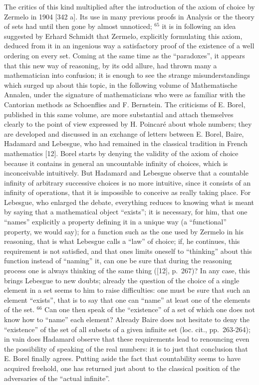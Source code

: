 The critics of this kind multiplied after the introduction of the axiom of choice by Zermelo in 1904 {[}342 a{]}. Its use in many previous proofs in Analysis or the theory of sets had until then gone by almost unnoticed; \(^{65}\) it is in following an idea suggested by Erhard Schmidt that Zermelo, explicitly formulating this axiom, deduced from it in an ingenious way a satisfactory proof of the existence of a well ordering on every set. Coming at the same time as the ``paradoxes'', it appears that this new way of reasoning, by its odd allure, had thrown many a mathematician into confusion; it is enough to see the strange misunderstandings which surged up about this topic, in the following volume of Mathematische Annalen, under the signature of mathematicians who were as familiar with the Cantorian methods as Schoenflies and F. Bernstein. The criticisms of E. Borel, published in this same volume, are more substantial and attach themselves clearly to the point of view expressed by H. Poincaré about whole numbers; they are developed and discussed in an exchange of letters between E. Borel, Baire, Hadamard and Lebesgue, who had remained in the classical tradition in French mathematics {[}12{]}. Borel starts by denying the validity of the axiom of choice because it contains in general an uncountable infinity of choices, which is inconceivable intuitively. But Hadamard and Lebesgue observe that a countable infinity of arbitrary successive choices is no more intuitive, since it consists of an infinity of operations, that it is impossible to conceive as really taking place. For Lebesgue, who enlarged the debate, everything reduces to knowing what is meant by saying that a mathematical object ``exists''; it is necessary, for him, that one ``names'' explicitly a property defining it in a unique way (a ``functional'' property, we would say); for a function such as the one used by Zermelo in his reasoning, that is what Lebesgue calls a ``law'' of choice; if, he continues, this requirement is not satisfied, and that ones limits oneself to ``thinking'' about this function instead of ``naming'' it, can one be sure that during the reasoning process one is always thinking of the same thing ({[}12{]}, p.~267)? In any case, this brings Lebesgue to new doubts; already the question of the choice of a single element in a set seems to him to raise difficulties: one must be sure that such an element ``exists'', that is to say that one can ``name'' at least one of the elements of the set. \(^{66}\) Can one then speak of the ``existence'' of a set of which one does not know how to ``name'' each element? Already Baire does not hesitate to deny the ``existence'' of the set of all subsets of a given infinite set (loc. cit., pp.~263-264); in vain does Hadamard observe that these requirements lead to renouncing even the possibility of speaking of the real numbers: it is to just that conclusion that E. Borel finally agrees. Putting aside the fact that countability seems to have acquired freehold, one has returned just about to the classical position of the adversaries of the ``actual infinite''.

